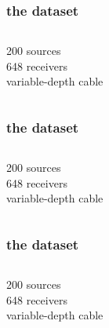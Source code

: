 \begin{frame}
\huge
\end{frame}
\begin{frame} \frametitle{the dataset}
\begin{columns}
      200 sources\\
      648 receivers \\
      variable-depth cable  
\end{columns}
\end{frame}


\begin{frame} \frametitle{the dataset}
\begin{columns}
      200 sources\\
      648 receivers \\
      variable-depth cable  
\end{columns}
\end{frame}


\begin{frame} \frametitle{the dataset}
\begin{columns}
      200 sources\\
      648 receivers \\
      variable-depth cable  
\end{columns}
\end{frame}




\begin{frame} 
\vspace{1cm}
\centering
    \begin{center}
    \end{center}
\end{frame} 

